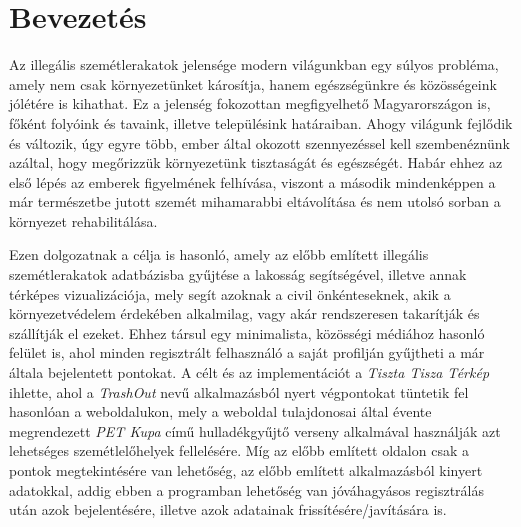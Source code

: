 \chapter{Bevezetés}
\label{ch:intro}

Az illegális szemétlerakatok jelensége modern világunkban egy súlyos probléma, amely nem csak környezetünket károsítja, hanem egészségünkre és közösségeink jólétére is kihathat. Ez a jelenség fokozottan megfigyelhető Magyarországon is, főként folyóink és tavaink, illetve településink határaiban. Ahogy világunk fejlődik és változik, úgy egyre több, ember által okozott szennyezéssel kell szembenéznünk azáltal, hogy megőrizzük környezetünk tisztaságát és egészségét. Habár ehhez az első lépés az emberek figyelmének felhívása, viszont a második mindenképpen a már természetbe jutott szemét mihamarabbi eltávolítása és nem utolsó sorban a környezet rehabilitálása.\par
Ezen dolgozatnak a célja is hasonló, amely az előbb említett illegális szemétlerakatok adatbázisba gyűjtése a lakosság segítségével, illetve annak térképes vizualizációja, mely segít azoknak a civil önkénteseknek, akik a környezetvédelem érdekében alkalmilag, vagy akár rendszeresen takarítják és szállítják el ezeket. Ehhez társul egy minimalista, közösségi médiához hasonló felület is, ahol minden regisztrált felhasználó a saját profilján gyűjtheti a már általa bejelentett pontokat. A célt és az implementációt a \textit{Tiszta Tisza Térkép} ihlette, ahol a \textit{TrashOut} nevű alkalmazásból nyert végpontokat tüntetik fel hasonlóan a weboldalukon, mely a weboldal tulajdonosai által évente megrendezett \textit{PET Kupa} című hulladékgyűjtő verseny alkalmával használják azt lehetséges szemétlelőhelyek fellelésére. Míg az előbb említett oldalon csak a pontok megtekintésére van lehetőség, az előbb említett alkalmazásból kinyert adatokkal, addig ebben a programban lehetőség van jóváhagyásos regisztrálás után azok bejelentésére, illetve azok adatainak frissítésére/javítására is.
\newpage